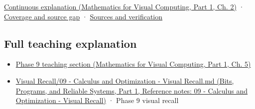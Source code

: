 \hypertarget{appendix-ab31ef447dbf-source-and-navigation}{}

\href{../02-Mathematics-for-Visual-Computing-P01/main.pdf\#01-foundations-i-ch018-keep-the-promises-visible-while-moving-between-representations}{Continuous explanation (Mathematics for Visual Computing, Part 1, Ch. 2)} · \hyperref[appendix-fd090d982a15-phase-7---parts-601-700]{Coverage and source gap} · \hyperref[appendix-a103e7846d21-phase-7---source-analysis-and-verification]{Sources and verification}

\subsection{Full teaching explanation}\label{appendix-ab31ef447dbf-full-teaching-explanation}

\hypertarget{appendix-ab31ef447dbf-full-teaching-explanation}{}

\begin{itemize}
\tightlist
\item
  \href{../02-Mathematics-for-Visual-Computing-P01/main.pdf\#02-foundations-ii-ch021-jacobians-curvature-and-local-approximation}{Phase 9 teaching section (Mathematics for Visual Computing, Part 1, Ch. 5)}
\item
  \href{../01-Bits-Programs-and-Reliable-Systems-P01/main.pdf\#appendix-adf48f5dc5c1}{Visual Recall/09 - Calculus and Optimization - Visual Recall.md (Bits, Programs, and Reliable Systems, Part 1, Reference notes: 09 - Calculus and Optimization - Visual Recall)} · Phase 9 visual recall
\end{itemize}
